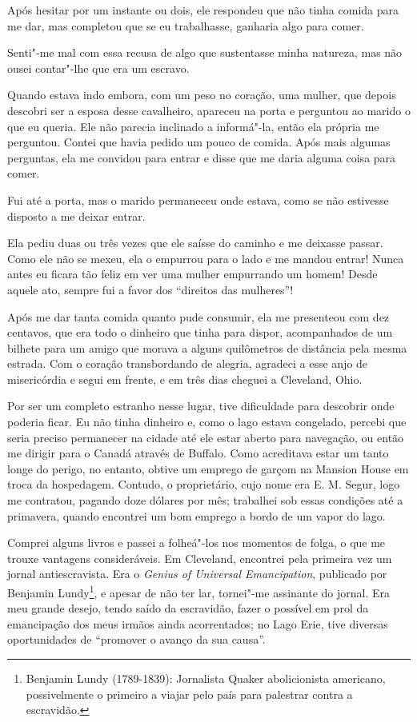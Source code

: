 Após hesitar por um instante ou dois, ele respondeu que não tinha comida
para me dar, mas completou que se eu trabalhasse, ganharia algo para
comer.

Senti"-me mal com essa recusa de algo que sustentasse minha natureza, mas
não ousei contar"-lhe que era um escravo.

Quando estava indo embora, com um peso no coração, uma mulher, que
depois descobri ser a esposa desse cavalheiro, apareceu na porta e
perguntou ao marido o que eu queria. Ele não parecia inclinado a
informá"-la, então ela própria me perguntou. Contei que havia pedido um
pouco de comida. Após mais algumas perguntas, ela me convidou para
entrar e disse que me daria alguma coisa para comer.

Fui até a porta, mas o marido permaneceu onde estava, como se não
estivesse disposto a me deixar entrar.

Ela pediu duas ou três vezes que ele saísse do caminho e me deixasse
passar. Como ele não se mexeu, ela o empurrou para o lado e me mandou
entrar! Nunca antes eu ficara tão feliz em ver uma mulher empurrando um
homem! Desde aquele ato, sempre fui a favor dos ``direitos das
mulheres''!

Após me dar tanta comida quanto pude consumir, ela me presenteou com dez
centavos, que era todo o dinheiro que tinha para dispor, acompanhados de
um bilhete para um amigo que morava a alguns quilômetros de distância
pela mesma estrada. Com o coração transbordando de alegria, agradeci a
esse anjo de misericórdia e segui em frente, e em três dias cheguei a
Cleveland, Ohio.

Por ser um completo estranho nesse lugar, tive dificuldade para
descobrir onde poderia ficar. Eu não tinha dinheiro e, como o lago
estava congelado, percebi que seria preciso permanecer na cidade até ele
estar aberto para navegação, ou então me dirigir para o Canadá através
de Buffalo. Como acreditava estar um tanto longe do perigo, no entanto,
obtive um emprego de garçom na Mansion House em troca da hospedagem.
Contudo, o proprietário, cujo nome era E. M. Segur, logo me contratou,
pagando doze dólares por mês; trabalhei sob essas condições até a
primavera, quando encontrei um bom emprego a bordo de um vapor do lago.

Comprei alguns livros e passei a folheá"-los nos momentos de folga, o que
me trouxe vantagens consideráveis. Em Cleveland, encontrei pela primeira
vez um jornal antiescravista. Era o \emph{Genius of Universal
Emancipation}, publicado por Benjamin Lundy\footnote{Benjamin Lundy
  (1789-1839): Jornalista Quaker abolicionista americano, possivelmente
  o primeiro a viajar pelo país para palestrar contra a escravidão.}, e
apesar de não ter lar, tornei"-me assinante do jornal. Era meu grande
desejo, tendo saído da escravidão, fazer o possível em prol da
emancipação dos meus irmãos ainda acorrentados; no Lago Erie, tive
diversas oportunidades de ``promover o avanço da sua causa''.

